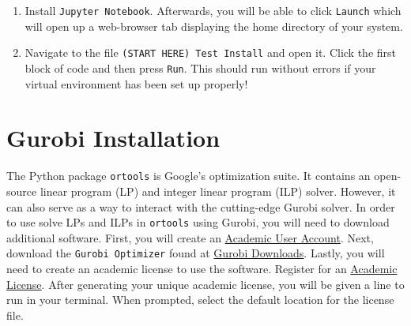 \documentclass[11 pt]{article}
\begin{document}
\begin{enumerate}
\item Install \texttt{Jupyter Notebook}. Afterwards, you will be able to click \texttt{Launch} which will open up a web-browser tab displaying the home directory of your system. 

\item Navigate to the file \texttt{(START HERE) Test Install} and open it. Click the first block of code and then press \texttt{Run}. This should run without errors if your virtual environment has been set up properly!

\end{enumerate}

\section{Gurobi Installation}

The Python package \texttt{ortools} is Google's optimization suite. It contains an open-source linear program (LP) and integer linear program (ILP) solver. However, it can also serve as a way to interact with the cutting-edge Gurobi solver. In order to use solve LPs and ILPs in \texttt{ortools} using Gurobi, you will need to download additional software. First, you will create an \href{https://pages.gurobi.com/registration}{Academic User Account}. Next, download the \texttt{Gurobi Optimizer} found at \href{https://www.gurobi.com/downloads/}{Gurobi Downloads}. Lastly, you will need to create an academic license to use the software. Register for an \href{https://www.gurobi.com/downloads/end-user-license-agreement-academic/}{Academic License}. After generating your unique academic license, you will be given a line to run in your terminal. When prompted, select the default location for the license file.


\begin{center}
\end{center}
\begin{center}
\end{center}
\end{document}
